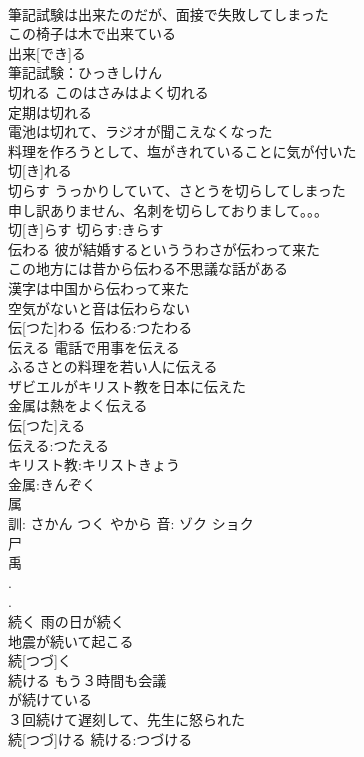 \documentclass[8pt]{extreport}
\begin{document}
\begin{CJK}{UTF8}{min}
\\	筆記試験は出来たのだが、面接で失敗してしまった 
\\	この椅子は木で出来ている 
\\	出来[でき]る		
\\	筆記試験：ひっきしけん
\\	切れる	このはさみはよく切れる 
\\	定期は切れる 
\\	電池は切れて、ラジオが聞こえなくなった 
\\	料理を作ろうとして、塩がきれていることに気が付いた 
\\	切[き]れる						
\\	切らす	うっかりしていて、さとうを切らしてしまった 
\\	申し訳ありません、名刺を切らしておりまして。。。 
\\	切[き]らす			切らす:きらす
\\	伝わる	彼が結婚するといううわさが伝わって来た 
\\	この地方には昔から伝わる不思議な話がある 
\\	漢字は中国から伝わって来た 
\\	空気がないと音は伝わらない 
\\	伝[つた]わる			伝わる:つたわる
\\	伝える	電話で用事を伝える 
\\	ふるさとの料理を若い人に伝える 
\\	ザビエルがキリスト教を日本に伝えた 
\\	金属は熱をよく伝える 
\\	伝[つた]える		
\\	伝える:つたえる
\\	キリスト教:キリストきょう
\\	金属:きんぞく
\\	属 
\\	訓: さかん つく やから 音: ゾク ショク 
\\	尸 
\\	禹 
\\	[屬]. 
\\	[屬].	
\\	続く	雨の日が続く 
\\	地震が続いて起こる 
\\	続[つづ]く						
\\	続ける	もう３時間も会議
\\	が続けている 
\\	３回続けて遅刻して、先生に怒られた 
\\	続[つづ]ける			続ける:つづける

\end{CJK}
\end{document}
